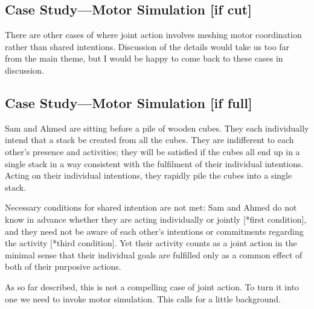 \documentclass[14pt,a4paper]{extarticle}
\begin{document}
\subsection{Case Study---Motor Simulation [if cut]}

There are other cases of where joint action involves meshing motor coordination rather than shared intentions.  Discussion of the details would take us too far from the main theme, but I would be happy to come back to these cases in discussion.


\subsection{Case Study---Motor Simulation [if full]}

Sam and Ahmed are sitting before a pile of wooden cubes.  They each individually intend that a stack be created from all the cubes.  They are indifferent to each other's presence and activities; they will be satisfied if the cubes all end up in a single stack in a way consistent with the fulfilment of their individual intentions.  Acting on their individual intentions, they rapidly pile the cubes into a single stack.

Necessary conditions for shared intention are not met: Sam and Ahmed do not know in advance whether they are acting individually or jointly [*first condition], and they need not be aware of each other's intentions or commitments regarding the activity [*third condition].  Yet their activity counts as a joint action in the minimal sense that their individual goals are fulfilled only as a common effect of both of their purposive actions.  

As so far described, this is not a compelling case of joint action.  To turn it into one we need to invoke motor simulation.  This calls for a little background.
\end{document}
